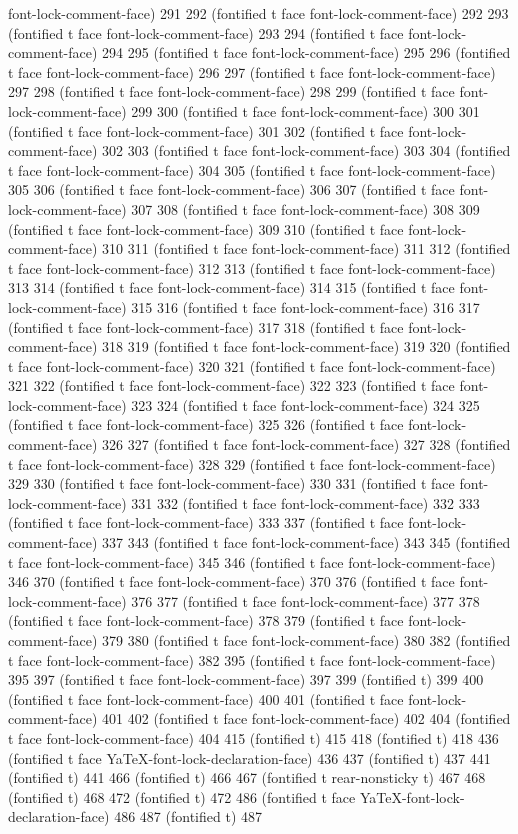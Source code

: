 font-lock-comment-face) 291 292 (fontified t face font-lock-comment-face) 292 293 (fontified t face font-lock-comment-face) 293 294 (fontified t face font-lock-comment-face) 294 295 (fontified t face font-lock-comment-face) 295 296 (fontified t face font-lock-comment-face) 296 297 (fontified t face font-lock-comment-face) 297 298 (fontified t face font-lock-comment-face) 298 299 (fontified t face font-lock-comment-face) 299 300 (fontified t face font-lock-comment-face) 300 301 (fontified t face font-lock-comment-face) 301 302 (fontified t face font-lock-comment-face) 302 303 (fontified t face font-lock-comment-face) 303 304 (fontified t face font-lock-comment-face) 304 305 (fontified t face font-lock-comment-face) 305 306 (fontified t face font-lock-comment-face) 306 307 (fontified t face font-lock-comment-face) 307 308 (fontified t face font-lock-comment-face) 308 309 (fontified t face font-lock-comment-face) 309 310 (fontified t face font-lock-comment-face) 310 311 (fontified t face font-lock-comment-face) 311 312 (fontified t face font-lock-comment-face) 312 313 (fontified t face font-lock-comment-face) 313 314 (fontified t face font-lock-comment-face) 314 315 (fontified t face font-lock-comment-face) 315 316 (fontified t face font-lock-comment-face) 316 317 (fontified t face font-lock-comment-face) 317 318 (fontified t face font-lock-comment-face) 318 319 (fontified t face font-lock-comment-face) 319 320 (fontified t face font-lock-comment-face) 320 321 (fontified t face font-lock-comment-face) 321 322 (fontified t face font-lock-comment-face) 322 323 (fontified t face font-lock-comment-face) 323 324 (fontified t face font-lock-comment-face) 324 325 (fontified t face font-lock-comment-face) 325 326 (fontified t face font-lock-comment-face) 326 327 (fontified t face font-lock-comment-face) 327 328 (fontified t face font-lock-comment-face) 328 329 (fontified t face font-lock-comment-face) 329 330 (fontified t face font-lock-comment-face) 330 331 (fontified t face font-lock-comment-face) 331 332 (fontified t face font-lock-comment-face) 332 333 (fontified t face font-lock-comment-face) 333 337 (fontified t face font-lock-comment-face) 337 343 (fontified t face font-lock-comment-face) 343 345 (fontified t face font-lock-comment-face) 345 346 (fontified t face font-lock-comment-face) 346 370 (fontified t face font-lock-comment-face) 370 376 (fontified t face font-lock-comment-face) 376 377 (fontified t face font-lock-comment-face) 377 378 (fontified t face font-lock-comment-face) 378 379 (fontified t face font-lock-comment-face) 379 380 (fontified t face font-lock-comment-face) 380 382 (fontified t face font-lock-comment-face) 382 395 (fontified t face font-lock-comment-face) 395 397 (fontified t face font-lock-comment-face) 397 399 (fontified t) 399 400 (fontified t face font-lock-comment-face) 400 401 (fontified t face font-lock-comment-face) 401 402 (fontified t face font-lock-comment-face) 402 404 (fontified t face font-lock-comment-face) 404 415 (fontified t) 415 418 (fontified t) 418 436 (fontified t face YaTeX-font-lock-declaration-face) 436 437 (fontified t) 437 441 (fontified t) 441 466 (fontified t) 466 467 (fontified t rear-nonsticky t) 467 468 (fontified t) 468 472 (fontified t) 472 486 (fontified t face YaTeX-font-lock-declaration-face) 486 487 (fontified t) 487 